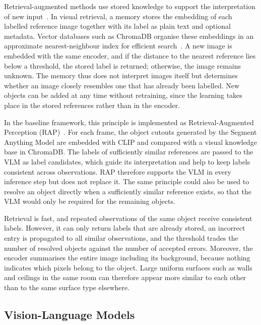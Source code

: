 {{{Retrieval-augmented methods use stored knowledge to support the interpretation of new input~\cite{lewis2020rag}. In visual retrieval, a memory stores the embedding of each labelled reference image together with its label as plain text and optional metadata. Vector databases such as ChromaDB organise these embeddings in an approximate nearest-neighbour index for efficient search~\cite{chroma2026docs}. A new image is embedded with the same encoder, and if the distance to the nearest reference lies below a threshold, the stored label is returned; otherwise, the image remains unknown. The memory thus does not interpret images itself but determines whether an image closely resembles one that has already been labelled. New objects can be added at any time without retraining, since the learning takes place in the stored references rather than in the encoder.

In the baseline framework, this principle is implemented as Retrieval-Augmented Perception (RAP)~\cite{previous_rsg_thesis}. For each frame, the object cutouts generated by the Segment Anything Model are embedded with CLIP and compared with a visual knowledge base in ChromaDB. The labels of sufficiently similar references are passed to the VLM as label candidates, which guide its interpretation and help to keep labels consistent across observations. RAP therefore supports the VLM in every inference step but does not replace it. The same principle could also be used to resolve an object directly when a sufficiently similar reference exists, so that the VLM would only be required for the remaining objects.

Retrieval is fast, and repeated observations of the same object receive consistent labels. However, it can only return labels that are already stored, an incorrect entry is propagated to all similar observations, and the threshold trades the number of resolved objects against the number of accepted errors. Moreover, the encoder summarises the entire image including its background, because nothing indicates which pixels belong to the object. Large uniform surfaces such as walls and ceilings in the same room can therefore appear more similar to each other than to the same surface type elsewhere.

}

\subsection{Vision-Language Models}
\label{subsec:vlm}

}}
